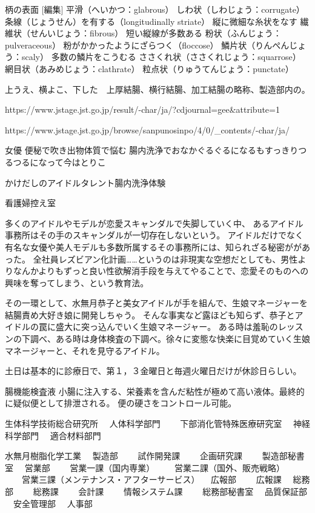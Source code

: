 柄の表面 [編集]
平滑（へいかつ：glabrous）
しわ状（しわじょう：corrugate）
条線（じょうせん）を有する（longitudinally striate）
縦に微細な糸状をなす
繊維状（せんいじょう：fibrous）
短い縦線が多数ある
粉状（ふんじょう：pulveraceous）
粉がかかったようにざらつく（floccose）
鱗片状（りんぺんじょう：scaly）
多数の鱗片をこうむる
ささくれ状（ささくれじょう：squarrose）
網目状（あみめじょう：clathrate）
粒点状（りゅうてんじょう：punctate）

上うえ、横よこ、下した　上厚結腸、横行結腸、加工結腸の略称、製造部内の。

https://www.jstage.jst.go.jp/result/-char/ja/?cdjournal=gee&attribute=1%

https://www.jstage.jst.go.jp/browse/sanpunosinpo/4/0/_contents/-char/ja/


女優
便秘で吹き出物体質で悩む
腸内洗浄でおなかぐるぐるになるもすっきりつるつるになって今はとりこ

かけだしのアイドルタレント腸内洗浄体験

看護婦控え室



多くのアイドルやモデルが恋愛スキャンダルで失脚していく中、
あるアイドル事務所はその手のスキャンダルが一切存在しないという。
アイドルだけでなく有名な女優や美人モデルも多数所属するその事務所には、知られざる秘密ががあった。
全社員レズビアン化計画……というのは非現実な空想だとしても、男性よりなんかよりもずっと良い性欲解消手段を与えてやることで、恋愛そのものへの興味を奪ってしまう、という教育法。

その一環として、水無月恭子と美女アイドルが手を組んで、生娘マネージャーを結腸責め大好き娘に開発しちゃう。
そんな事実など露ほども知らず、恭子とアイドルの罠に盛大に突っ込んでいく生娘マネージャー。
ある時は羞恥のレッスンの下調べ、ある時は身体検査の下調べ。徐々に変態な快楽に目覚めていく生娘マネージャーと、それを見守るアイドル。


土日は基本的に診療日で、第１，３金曜日と毎週火曜日だけが休診日らしい。



腸機能検査液
小腸に注入する、栄養素を含んだ粘性が極めて高い液体。最終的に疑似便として排泄される。
便の硬さをコントロール可能。


生体科学技術総合研究所
　人体科学部門
　　下部消化管特殊医療研究室
　神経科学部門
　適合材料部門



水無月樹脂化学工業
　製造部
　　試作開発課
　　企画研究課
　　製造部秘書室
　営業部
　　営業一課（国内専業）
　　営業二課（国外、販売戦略）
　　営業三課（メンテナンス・アフターサービス）
　広報部
　　広報課
　総務部
　　総務課
　　会計課
　　情報システム課
　　総務部秘書室
　品質保証部
　安全管理部
　人事部


